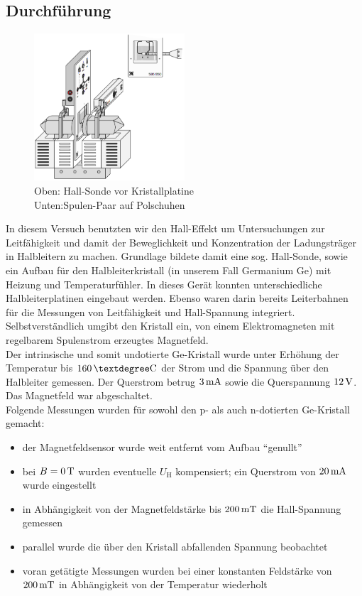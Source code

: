\documentclass[numbers=noenddot,14pt,a4paper]{scrartcl}
\newcommand{\ix}[1]{_\text{#1}}
\begin{document}
\subsection{Durchführung}
\begin{figure}
	\centering
	\includegraphics[width=0.5\textwidth]{aufbau.png}
	\caption{Oben: Hall-Sonde vor Kristallplatine\\Unten:Spulen-Paar auf Polschuhen}
\end{figure}
In diesem Versuch benutzten wir den Hall-Effekt um Untersuchungen zur Leitfähigkeit und damit der Beweglichkeit und Konzentration der Ladungsträger in Halbleitern zu machen. Grundlage bildete damit eine sog. Hall-Sonde, sowie ein Aufbau für den Halbleiterkristall (in unserem Fall Germanium Ge) mit Heizung und Temperaturfühler. In dieses Gerät konnten unterschiedliche Halbleiterplatinen eingebaut werden. Ebenso waren darin bereits Leiterbahnen für die Messungen von Leitfähigkeit und Hall-Spannung integriert. Selbstverständlich umgibt den Kristall ein, von einem Elektromagneten mit regelbarem Spulenstrom erzeugtes Magnetfeld.\\
Der intrinsische und somit undotierte Ge-Kristall wurde unter Erhöhung der Temperatur bis $\unit[160]{°C}$ der Strom und die Spannung über den Halbleiter gemessen. Der Querstrom betrug $\unit[3]{mA}$ sowie die Querspannung $\unit[12]{V}$. Das Magnetfeld war abgeschaltet.\\
Folgende Messungen wurden für sowohl den p- als auch n-dotierten Ge-Kristall gemacht:
\begin{itemize}
	\item{der Magnetfeldsensor wurde weit entfernt vom Aufbau "`genullt"'}
	\item{bei $B=\unit[0]{T}$ wurden eventuelle $U\ix{H}$ kompensiert; ein Querstrom von $\unit[20]{mA}$ wurde eingestellt}
	\item{in Abhängigkeit von der Magnetfeldstärke bis $\unit[200]{mT}$ die Hall-Spannung gemessen}
	\item{parallel wurde die über den Kristall abfallenden Spannung beobachtet}
	\item{voran getätigte Messungen wurden bei einer konstanten Feldstärke von $\unit[200]{mT}$ in Abhängigkeit von der Temperatur wiederholt}
\end{itemize}
\end{document}
